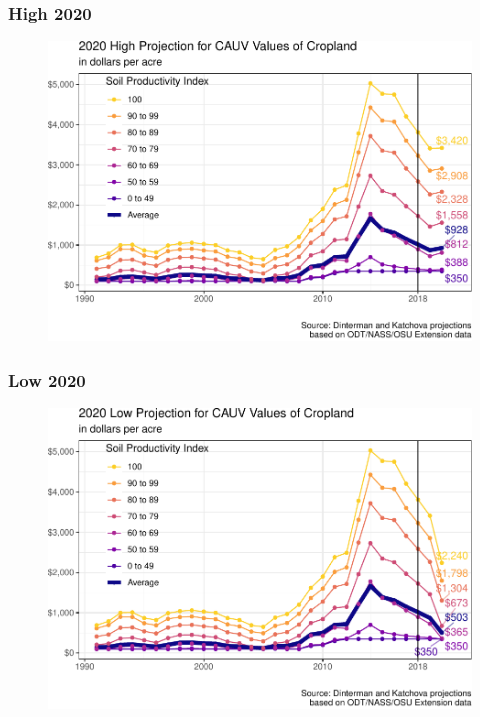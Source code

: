 \documentclass[]{article}
\begin{document}
\hypertarget{high-2020}{%
\subsubsection{High 2020}\label{high-2020}}

\begin{figure}[H]
\includegraphics[width=1\linewidth]{4-projections-2019-2020_files/figure-latex/high-trend-2020-1} \caption{\label{fig:high-trend-2020}}\label{fig:high-trend-2020}
\end{figure}

\hypertarget{low-2020}{%
\subsubsection{Low 2020}\label{low-2020}}

\begin{figure}[H]
\includegraphics[width=1\linewidth]{4-projections-2019-2020_files/figure-latex/low-trend-2020-1} \caption{\label{fig:low-trend-2020}}\label{fig:low-trend-2020}
\end{figure}
\end{document}
